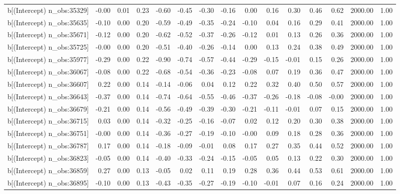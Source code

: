 \begin{table}[ht]
\begin{tabular}{rrrrrrrrrrrrrrr}
  b[(Intercept) n\_obs:35329] & -0.00 & 0.01 & 0.23 & -0.60 & -0.45 & -0.30 & -0.16 & 0.00 & 0.16 & 0.30 & 0.46 & 0.62 & 2000.00 & 1.00 \\ 
  b[(Intercept) n\_obs:35635] & -0.10 & 0.00 & 0.20 & -0.59 & -0.49 & -0.35 & -0.24 & -0.10 & 0.04 & 0.16 & 0.29 & 0.41 & 2000.00 & 1.00 \\ 
  b[(Intercept) n\_obs:35671] & -0.12 & 0.00 & 0.20 & -0.62 & -0.52 & -0.37 & -0.26 & -0.12 & 0.01 & 0.13 & 0.26 & 0.36 & 2000.00 & 1.00 \\ 
  b[(Intercept) n\_obs:35725] & -0.00 & 0.00 & 0.20 & -0.51 & -0.40 & -0.26 & -0.14 & 0.00 & 0.13 & 0.24 & 0.38 & 0.49 & 2000.00 & 1.00 \\ 
  b[(Intercept) n\_obs:35977] & -0.29 & 0.00 & 0.22 & -0.90 & -0.74 & -0.57 & -0.44 & -0.29 & -0.15 & -0.01 & 0.15 & 0.26 & 2000.00 & 1.00 \\ 
  b[(Intercept) n\_obs:36067] & -0.08 & 0.00 & 0.22 & -0.68 & -0.54 & -0.36 & -0.23 & -0.08 & 0.07 & 0.19 & 0.36 & 0.47 & 2000.00 & 1.00 \\ 
  b[(Intercept) n\_obs:36607] & 0.22 & 0.00 & 0.14 & -0.14 & -0.06 & 0.04 & 0.12 & 0.22 & 0.32 & 0.40 & 0.50 & 0.57 & 2000.00 & 1.00 \\ 
  b[(Intercept) n\_obs:36643] & -0.37 & 0.00 & 0.14 & -0.74 & -0.64 & -0.55 & -0.46 & -0.37 & -0.26 & -0.18 & -0.08 & -0.00 & 2000.00 & 1.00 \\ 
  b[(Intercept) n\_obs:36679] & -0.21 & 0.00 & 0.14 & -0.56 & -0.49 & -0.39 & -0.30 & -0.21 & -0.11 & -0.01 & 0.07 & 0.15 & 2000.00 & 1.00 \\ 
  b[(Intercept) n\_obs:36715] & 0.03 & 0.00 & 0.14 & -0.32 & -0.25 & -0.16 & -0.07 & 0.02 & 0.12 & 0.20 & 0.30 & 0.38 & 2000.00 & 1.00 \\ 
  b[(Intercept) n\_obs:36751] & -0.00 & 0.00 & 0.14 & -0.36 & -0.27 & -0.19 & -0.10 & -0.00 & 0.09 & 0.18 & 0.28 & 0.36 & 2000.00 & 1.00 \\ 
  b[(Intercept) n\_obs:36787] & 0.17 & 0.00 & 0.14 & -0.18 & -0.09 & -0.01 & 0.08 & 0.17 & 0.27 & 0.35 & 0.44 & 0.52 & 2000.00 & 1.00 \\ 
  b[(Intercept) n\_obs:36823] & -0.05 & 0.00 & 0.14 & -0.40 & -0.33 & -0.24 & -0.15 & -0.05 & 0.05 & 0.13 & 0.22 & 0.30 & 2000.00 & 1.00 \\ 
  b[(Intercept) n\_obs:36859] & 0.27 & 0.00 & 0.13 & -0.05 & 0.02 & 0.11 & 0.19 & 0.28 & 0.36 & 0.44 & 0.53 & 0.61 & 2000.00 & 1.00 \\ 
  b[(Intercept) n\_obs:36895] & -0.10 & 0.00 & 0.13 & -0.43 & -0.35 & -0.27 & -0.19 & -0.10 & -0.01 & 0.07 & 0.16 & 0.24 & 2000.00 & 1.00 \\ 

\end{tabular}
\end{table}
